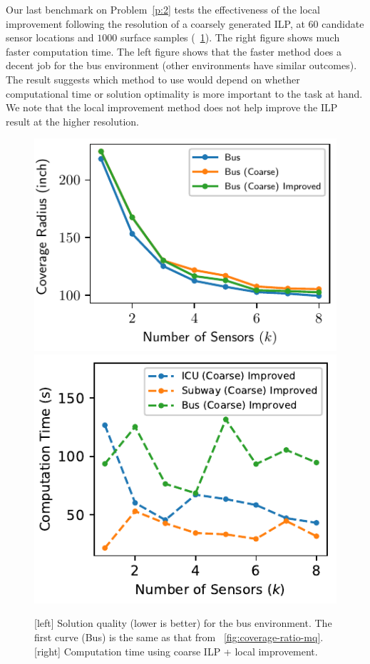 Our last benchmark on Problem~\ref{p:2} tests the effectiveness of the local improvement following the resolution of a coarsely generated ILP, at $60$ candidate sensor locations and $1000$ surface samples (~\ref{fig:coverage-ratio-cu}). The right figure shows much faster computation time. The left figure shows that the  faster method does a decent job for the bus environment (other environments have similar outcomes). The result suggests which method to use would depend on whether computational time or solution optimality is more important to the task at hand. We note that the local improvement method does not help improve the ILP result at the higher resolution. 

\begin{figure}[!ht]
    \centering
    \includegraphics[width=.48\columnwidth, height=1.in]{chapters/surf/fig/result-bus-mq-eps-converted-to.pdf}
    \includegraphics[width=.48\columnwidth, height=1.in]{chapters/surf/fig/result-time-mq-coarse-eps-converted-to.pdf}    
    \caption{ [left] Solution quality (lower is better) for the bus environment. 
    The first curve (Bus) is the same as that from ~\ref{fig:coverage-ratio-mq}. 
    [right] Computation time using coarse ILP + local improvement.}
\label{fig:coverage-ratio-cu}
\end{figure}

